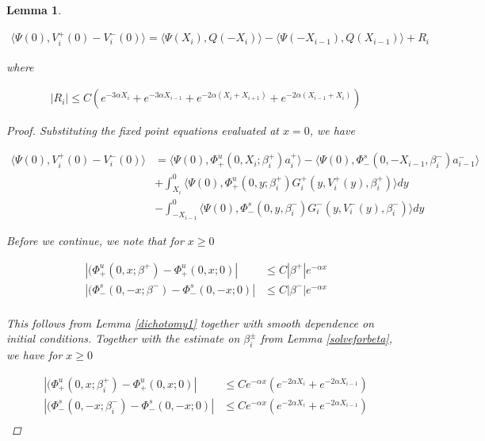 \documentclass[12pt]{article}
\newtheorem{lemma}{Lemma}
\begin{document}

\begin{lemma}\label{jumplemma1}

\begin{align*}
\langle \Psi(0), V_i^+(0) - V_i^-(0) \rangle = 
\langle \Psi(X_i), Q(-X_i) \rangle - \langle \Psi(-X_{i-1}), Q(X_{i-1}) \rangle + R_i
\end{align*}

where 

\begin{align*}
|R_i| \leq C ( e^{-3 \alpha X_i} +  e^{-3 \alpha X_{i-1}}
+ e^{-2 \alpha (X_i + X_{i+1})} + e^{-2 \alpha (X_{i-1} + X_i)})
\end{align*}

\begin{proof}

Substituting the fixed point equations evaluated at $x = 0$, we have

\begin{align*}
\langle \Psi(0), V_i^+(0) - V_i^-(0) \rangle &= \langle \Psi(0), \Phi^u_+(0, X_i; \beta_i^+) a_i^+ \rangle
- \langle \Psi(0), \Phi^s_-(0, -X_{i-1}, \beta_i^-) a_{i-1}^- \rangle \\
&+ \int_{X_i}^0 \langle \Psi(0), \Phi_+^u(0, y; \beta_i^+) G_i^+(y, V_i^+(y),\beta_i^+) \rangle dy \\
&- \int_{-X_{i-1}}^0 \langle \Psi(0), \Phi_-^s(0, y, \beta_i^-) G_i^-(y, V_i^-(y),\beta_i^-) \rangle dy
\end{align*}

Before we continue, we note that for $x \geq 0$

\begin{align*}
|(\Phi_+^u(0, x; \beta^+) - \Phi_+^u(0, x; 0)| &\leq C |\beta^+| e^{-\alpha x} \\
|(\Phi_-^s(0, -x; \beta^-) - \Phi_-^s(0, -x; 0)| &\leq C |\beta^-| e^{-\alpha x} \\
\end{align*}

This follows from Lemma \ref{dichotomy1} together with smooth dependence on initial conditions. Together with the estimate on $\beta_i^\pm$ from Lemma \ref{solveforbeta}, we have for $x \geq 0$

\begin{align*}
|(\Phi_+^u(0, x; \beta_i^+) - \Phi_+^u(0, x; 0)| &\leq C e^{-\alpha x} (e^{-2 \alpha X_i} + e^{-2 \alpha X_{i-1}})\\
|(\Phi_-^s(0, -x; \beta_i^-) - \Phi_-^s(0, -x; 0)| &\leq C e^{-\alpha x} (e^{-2 \alpha X_i} + e^{-2 \alpha X_{i-1}}) \\
\end{align*}


\end{proof}
\end{lemma}
\end{document}
